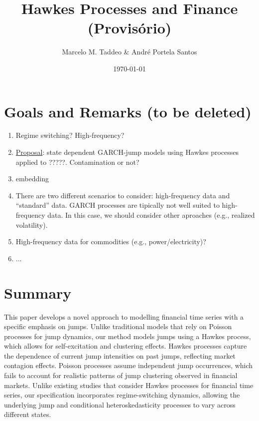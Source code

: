 \documentclass[11pt]{article}
\begin{document}

\title{Hawkes Processes and Finance (Provis\'orio)}
\author{Marcelo M. Taddeo \& André Portela Santos}
\date{\today}

\maketitle

{\color{blue}
\section*{Goals and Remarks (to be deleted)}

\begin{enumerate}
\item Regime switching? High-frequency?
\item \underline{Proposal}: state dependent GARCH-jump models using Hawkes processes applied to ?????. Contamination or not?
\item embedding
\item There are two different scenarios to consider: high-frequency data and ``standard'' data. GARCH processes are tipically not well suited to high-frequency data. In this case, we should consider other aproaches (e.g., realized volatility).
\item High-frequency data for commodities (e.g., power/electricity)?
\item ...
\end{enumerate}
}

\section*{Summary}

This paper develops a novel approach to modelling financial time series with a specific emphasis on jumps. Unlike traditional models that rely on Poisson processes for jump dynamics, our method models jumps using a Hawkes process, which allows for self-excitation and clustering effects. Hawkes processes capture the dependence of current jump intensities on past jumps, reflecting market contagion effects. Poisson processes assume independent jump occurrences, which fails to account for realistic patterns of jump clustering observed in financial markets. Unlike existing studies that consider Hawkes processes for financial time series, our specification incorporates regime-switching dynamics, allowing the underlying jump and conditional heteroskedasticity processes to vary across different states.
\end{document}
